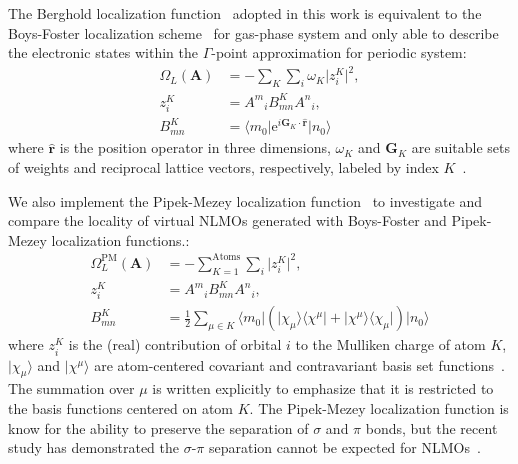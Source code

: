 \documentclass[aps,prl,reprint,amsmath,amssymb]{revtex4-1}
\newcommand*{\imi}{i} %
\newcommand*{\E}{\mathrm{e}}
\newcommand{\ket}[1]{\ensuremath{\vert #1 \rangle}}
\newcommand{\bra}[1]{\ensuremath{\langle #1 \vert}}
\newcommand{\ketbra}[2]{\ensuremath{\vert #1 \rangle \langle #2 \vert}} %
\newcommand{\op}[1]{\ensuremath{\hat{#1}}} %
\begin{document}
The Berghold localization function~\cite{resta1998quantum, resta1999electron, berghold2000general}  adopted in this work is equivalent to the Boys-Foster localization scheme~\cite{berghold2000general, resta1999electron} for gas-phase system and only able to describe the electronic states within the  $\Gamma$-point approximation for periodic system:
%
\begin{equation} \label{eq:fun-loc}
\begin{split}
\Omega_L(\mathbf{A}) &= - \sum_K \sum_i \omega_K \vert z_{i}^{K} \vert^2, \\
z_{i}^{K} &= {A^m}_i B^{K}_{mn} {A^n}_i, \\
B^{K}_{mn} &= \bra{m_0} \E^{\imi \mathbf{G}_K \cdot \mathbf{\op{r}}} \ket{n_0}
\end{split}
\end{equation}
%
where $\mathbf{\op{r}}$ is the position operator in three dimensions, $\omega_K$ and $\mathbf{G}_K$ are suitable sets of weights and reciprocal lattice vectors, respectively, labeled by index $K$~\cite{silvestrelli1999maximally, berghold2000general}. 

We also implement the Pipek-Mezey localization function~\cite{pipek1989fast,lehtola2014pipek} to investigate and compare the locality of virtual NLMOs generated with Boys-Foster and Pipek-Mezey localization functions.:
%
\begin{equation} \label{eq:pipek}
\begin{split}
\Omega_L^{\text{PM}}(\mathbf{A}) &= - \sum_{K=1}^{\text{Atoms}} \sum_i \vert z_{i}^{K} \vert^2, \\
z_{i}^{K} &= {A^m}_i B^{K}_{mn} {A^n}_i, \\
B^{K}_{mn} &= \frac{1}{2} \sum_{\mu \in K} \bra{m_0}  \left( \ketbra{\chi_{\mu}}{\chi^{\mu}} + \ketbra{\chi^{\mu}}{\chi_{\mu}} \right) \ket{n_0}
\end{split}
\end{equation}
%
where $z_{i}^{K}$ is the (real) contribution of orbital $i$ to the Mulliken charge of atom $K$, $\ket{\chi_\mu}$ and $\ket{\chi^\mu}$ are atom-centered covariant and contravariant basis set functions~\cite{silvestrelli1999maximally, berghold2000general}. The summation over $\mu$ is written explicitly to emphasize that it is restricted to the basis functions centered on atom $K$. 
The Pipek-Mezey localization function is know for the ability to preserve the separation of $\sigma$ and $\pi$ bonds, but the recent study has demonstrated the $\sigma$-$\pi$ separation cannot be expected for NLMOs~\cite{luo2020direct}.
\end{document}
